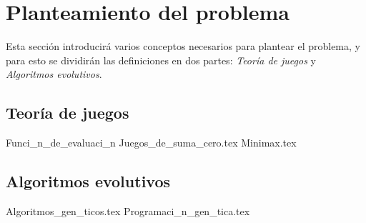  
\section{Planteamiento del problema}
  Esta sección introducirá varios conceptos necesarios para plantear el problema, y para esto se 
  dividirán las definiciones en dos partes: \textit{Teoría de juegos} y \textit{Algoritmos 
  evolutivos}.
  
  \subsection{Teoría de juegos}    
    {Funci_n_de_evaluaci_n}
    {Juegos_de_suma_cero.tex}
    {Minimax.tex}
  
  \subsection{Algoritmos evolutivos}
    {Algoritmos_gen_ticos.tex}
    {Programaci_n_gen_tica.tex}

  
    
  